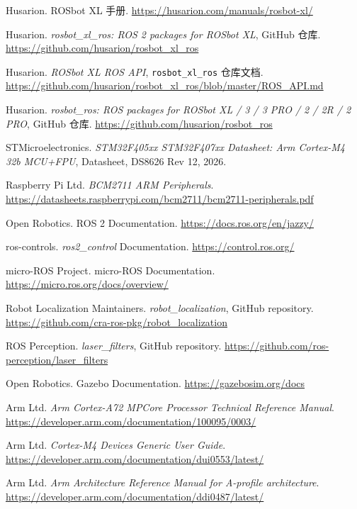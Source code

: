 \documentclass[UTF8,a4paper,12pt]{ctexrep}
\begin{document}
\begingroup
\sloppy
\begin{enumerate}[label={[\arabic*]}]
  \item Husarion. ROSbot XL 手册. \url{https://husarion.com/manuals/rosbot-xl/}
  \item Husarion. \textit{rosbot\_xl\_ros: ROS 2 packages for ROSbot XL}, GitHub 仓库. \url{https://github.com/husarion/rosbot_xl_ros}
  \item Husarion. \textit{ROSbot XL ROS API}, \texttt{rosbot\_xl\_ros} 仓库文档. \url{https://github.com/husarion/rosbot_xl_ros/blob/master/ROS_API.md}
  \item Husarion. \textit{rosbot\_ros: ROS packages for ROSbot XL / 3 / 3 PRO / 2 / 2R / 2 PRO}, GitHub 仓库. \url{https://github.com/husarion/rosbot_ros}
  \item STMicroelectronics. \textit{STM32F405xx STM32F407xx Datasheet: Arm Cortex-M4 32b MCU+FPU}, Datasheet, DS8626 Rev 12, 2026.
  \item Raspberry Pi Ltd. \textit{BCM2711 ARM Peripherals}. \url{https://datasheets.raspberrypi.com/bcm2711/bcm2711-peripherals.pdf}
  \item Open Robotics. ROS 2 Documentation. \url{https://docs.ros.org/en/jazzy/}
  \item ros-controls. \textit{ros2\_control} Documentation. \url{https://control.ros.org/}
  \item micro-ROS Project. micro-ROS Documentation. \url{https://micro.ros.org/docs/overview/}
  \item Robot Localization Maintainers. \textit{robot\_localization}, GitHub repository. \url{https://github.com/cra-ros-pkg/robot_localization}
  \item ROS Perception. \textit{laser\_filters}, GitHub repository. \url{https://github.com/ros-perception/laser_filters}
  \item Open Robotics. Gazebo Documentation. \url{https://gazebosim.org/docs}
  \item Arm Ltd. \textit{Arm Cortex-A72 MPCore Processor Technical Reference Manual}. \url{https://developer.arm.com/documentation/100095/0003/}
  \item Arm Ltd. \textit{Cortex-M4 Devices Generic User Guide}. \url{https://developer.arm.com/documentation/dui0553/latest/}
  \item Arm Ltd. \textit{Arm Architecture Reference Manual for A-profile architecture}. \url{https://developer.arm.com/documentation/ddi0487/latest/}
\end{enumerate}
\endgroup
\end{document}
